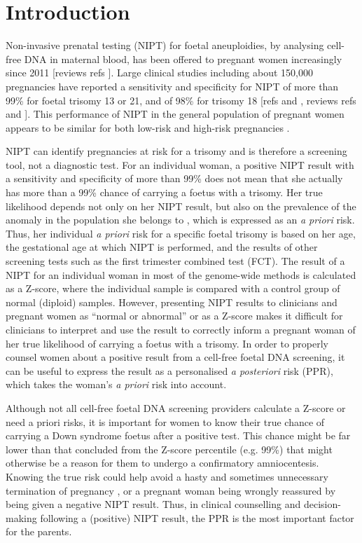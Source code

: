 \section{Introduction}\label{introduction}
Non-invasive prenatal testing (NIPT) for foetal aneuploidies, by analysing cell-free DNA in maternal blood, has been offered to pregnant women increasingly since 2011 [reviews refs \cite{Benn_2013,Norwitz_2013,Gil_2013}]. 
Large clinical studies including about 150,000 pregnancies have reported a sensitivity and specificity for NIPT of more than 99\% for foetal trisomy 13 or 21, and of 98\% for trisomy 18 [refs \cite{Zhang_2015} and \cite{Norton_2015}, reviews refs \cite{Benn_2013} and \cite{Norwitz_2013}]. 
This performance of NIPT in the general population of pregnant women \cite{Gil_2013,Zhang_2015,Norton_2015,Dan_2012,Nicolaides_2012,Fairbrother_2013,Lau_2014,Bianchi_2014} appears to be similar for both low-risk and high-risk pregnancies \cite{Zhang_2015,Norton_2015,Bianchi_2014,Dar_2014}.

NIPT can identify pregnancies at risk for a trisomy and is therefore a screening tool, not a diagnostic test. 
For an individual woman, a positive NIPT result with a sensitivity and specificity of more than 99\% does not mean that she actually has more than a 99\% chance of carrying a foetus with a trisomy. 
Her true likelihood depends not only on her NIPT result, but also on the prevalence of the anomaly in the population she belongs to \cite{Morain_2013}, which is expressed as an \textsl{a priori} risk. 
Thus, her individual \textsl{a priori} risk for a specific foetal trisomy is based on her age, the gestational age at which NIPT is performed, and the results of other screening tests such as the first trimester combined test (FCT). 
The result of a NIPT for an individual woman in most of the genome-wide methods is calculated as a Z-score, where the individual sample is compared with a control group of normal (diploid) samples. 
However, presenting NIPT results to clinicians and pregnant women as “normal or abnormal” or as a Z-score makes it difficult for clinicians to interpret and use the result to correctly inform a pregnant woman of her true likelihood of carrying a foetus with a trisomy. 
In order to properly counsel women about a positive result from a cell-free foetal DNA screening, it can be useful to express the result as a personalised \textsl{a posteriori} risk (PPR), which takes the woman’s \textsl{a priori} risk into account.

Although not all cell-free foetal DNA screening providers calculate a Z-score or need a priori risks, it is important for women to know their true chance of carrying a Down syndrome foetus after a positive test. 
This chance might be far lower than that concluded from the Z-score percentile (e.g. 99\%) that might otherwise be a reason for them to undergo a confirmatory amniocentesis. 
Knowing the true risk could help avoid a hasty and sometimes unnecessary termination of pregnancy \cite{Willems_2014,Cheung_2015}, or a pregnant woman being wrongly reassured by being given a negative NIPT result. 
Thus, in clinical counselling and decision-making following a (positive) NIPT result, the PPR is the most important factor for the parents.

